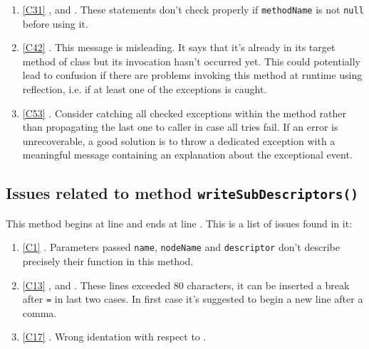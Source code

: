 \begin{enumerate}
	\item \ref{C31} ,  and . These statements don't check properly if \texttt{methodName} is not \texttt{null} before using it.
	\item \ref{C42} . This message is misleading. It says that it's already in its target method of class but its invocation hasn't occurred yet. This could potentially lead to confusion if there are problems invoking this method at runtime using reflection, i.e. if at least one of the exceptions is caught.
	\item \ref{C53} . Consider catching all checked exceptions within the method rather than propagating the last one to caller in case all tries fail. If an error is unrecoverable, a good solution is to throw a dedicated exception with a meaningful message containing an explanation about the exceptional event. 
\end{enumerate}

\subsection{Issues related to method \texttt{writeSubDescriptors()}}
This method begins at line  and ends at line . This is a list of issues found in it:
\begin{enumerate}
\item \ref{C1} . Parameters passed \texttt{name}, \texttt{nodeName} and \texttt{descriptor} don't describe precisely their function in this method.
\item \ref{C13} ,  and . These lines exceeded 80 characters, it can be inserted a break after \texttt{=} in last two cases. In first case it's suggested to begin a new line after a comma.
\item \ref{C17} . Wrong identation with respect to . 
\end{enumerate}
